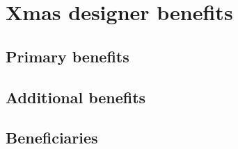 \section{Xmas designer benefits}
\subsection{Primary benefits}
\subsection{Additional benefits}
\subsection{Beneficiaries}